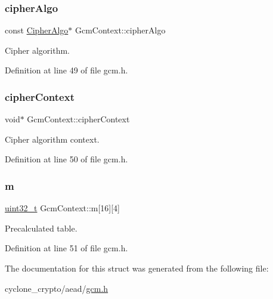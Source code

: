 \subsubsection{\texorpdfstring{cipher\+Algo}{cipherAlgo}}
{\footnotesize\ttfamily const \hyperlink{structCipherAlgo}{Cipher\+Algo}$\ast$ Gcm\+Context\+::cipher\+Algo}



Cipher algorithm. 



Definition at line 49 of file gcm.\+h.

\mbox{\label{structGcmContext_aa5080560b185493361680b1b0a02c2ec}} 
\subsubsection{\texorpdfstring{cipher\+Context}{cipherContext}}
{\footnotesize\ttfamily void$\ast$ Gcm\+Context\+::cipher\+Context}



Cipher algorithm context. 



Definition at line 50 of file gcm.\+h.

\mbox{\label{structGcmContext_af5ec6bf9a36e7a98a7645517d8b77733}} 
\subsubsection{\texorpdfstring{m}{m}}
{\footnotesize\ttfamily \hyperlink{stdint_8h_a435d1572bf3f880d55459d9805097f62}{uint32\+\_\+t} Gcm\+Context\+::m\mbox{[}16\mbox{]}\mbox{[}4\mbox{]}}



Precalculated table. 



Definition at line 51 of file gcm.\+h.



The documentation for this struct was generated from the following file\+:\begin{DoxyCompactItemize}
\item 
cyclone\+\_\+crypto/aead/\hyperlink{gcm_8h}{gcm.\+h}\end{DoxyCompactItemize}
